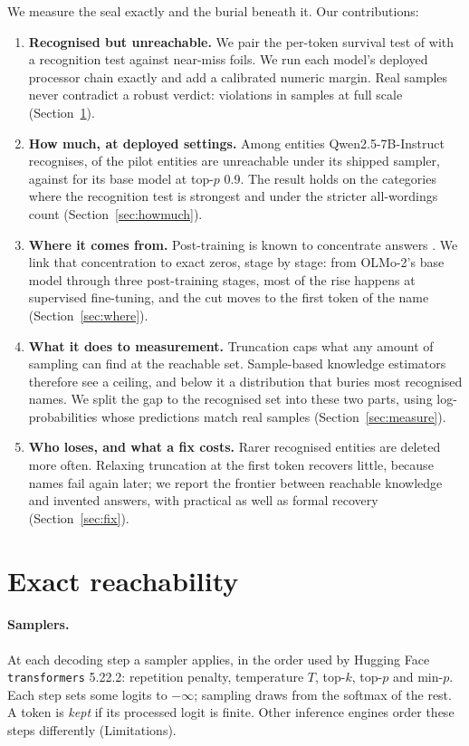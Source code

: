 \documentclass[11pt]{article}
\begin{document}
We measure the seal exactly and the burial beneath it. Our contributions:
\begin{enumerate}
\item \textbf{Recognised but unreachable.} We pair the per-token survival test of \citet{awad2026lost} with a recognition test against near-miss foils. We run each model's deployed processor chain exactly and add a calibrated numeric margin. Real samples never contradict a robust verdict: \ptViolationsTotal{} violations in \ptSamplesTotal{} samples at full scale (Section~\ref{sec:method}).
\item \textbf{How much, at deployed settings.} Among entities Qwen2.5-7B-Instruct recognises, \gzQwenInstShipped{} of the pilot entities are unreachable under its shipped sampler, against \gzQwenBasePnine{} for its base model at top-$p$ 0.9. The result holds on the categories where the recognition test is strongest and under the stricter all-wordings count (Section~\ref{sec:howmuch}).
\item \textbf{Where it comes from.} Post-training is known to concentrate answers \citep{jang2026instruction,parikh2026census}. We link that concentration to exact zeros, stage by stage: from OLMo-2's base model through three post-training stages, most of the rise happens at supervised fine-tuning, and the cut moves to the first token of the name (Section~\ref{sec:where}).
\item \textbf{What it does to measurement.} Truncation caps what any amount of sampling can find at the reachable set. Sample-based knowledge estimators therefore see a ceiling, and below it a distribution that buries most recognised names. We split the gap to the recognised set into these two parts, using log-probabilities whose predictions match real samples (Section~\ref{sec:measure}).
\item \textbf{Who loses, and what a fix costs.} Rarer recognised entities are deleted more often. Relaxing truncation at the first token recovers little, because names fail again later; we report the frontier between reachable knowledge and invented answers, with practical as well as formal recovery (Section~\ref{sec:fix}). \pdSelfCheckFix{}
\end{enumerate}

\section{Exact reachability}\label{sec:method}

\paragraph{Samplers.} At each decoding step a sampler applies, in the order used by Hugging Face \texttt{transformers} 5.22.2: repetition penalty, temperature $T$, top-$k$, top-$p$ and min-$p$. Each step sets some logits to $-\infty$; sampling draws from the softmax of the rest. A token is \emph{kept} if its processed logit is finite. Other inference engines order these steps differently (Limitations).
\end{document}
